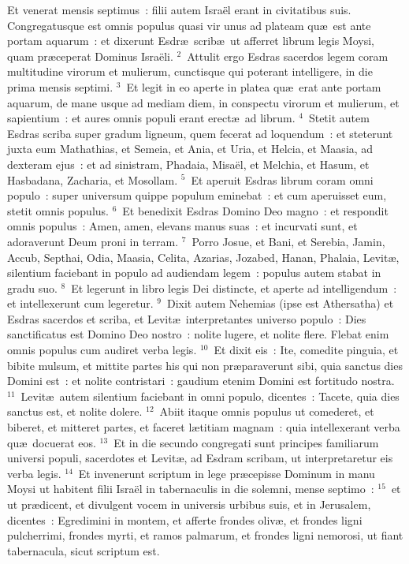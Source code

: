 \lettrine[lines=10,image=true,loversize=0.05,lraise=-0.03]{E}{}t venerat mensis septimus~: filii autem Isra\"el erant in civitatibus suis. Congregatusque est omnis populus quasi vir unus ad plateam qu\ae\ est ante portam aquarum~: et dixerunt Esdr\ae\ scrib\ae\ ut afferret librum legis Moysi, quam pr\ae ceperat Dominus Isra\"eli.
${}^{2}$~Attulit ergo Esdras sacerdos legem coram multitudine virorum et mulierum, cunctisque qui poterant intelligere, in die prima mensis septimi.
${}^{3}$~Et legit in eo aperte in platea qu\ae\ erat ante portam aquarum, de mane usque ad mediam diem, in conspectu virorum et mulierum, et sapientium~: et aures omnis populi erant erect\ae\ ad librum.
${}^{4}$~Stetit autem Esdras scriba super gradum ligneum, quem fecerat ad loquendum~: et steterunt juxta eum Mathathias, et Semeia, et Ania, et Uria, et Helcia, et Maasia, ad dexteram ejus~: et ad sinistram, Phadaia, Misa\"el, et Melchia, et Hasum, et Hasbadana, Zacharia, et Mosollam.
${}^{5}$~Et aperuit Esdras librum coram omni populo~: super universum quippe populum eminebat~: et cum aperuisset eum, stetit omnis populus.
${}^{6}$~Et benedixit Esdras Domino Deo magno~: et respondit omnis populus~: Amen, amen, elevans manus suas~: et incurvati sunt, et adoraverunt Deum proni in terram.
${}^{7}$~Porro Josue, et Bani, et Serebia, Jamin, Accub, Septhai, Odia, Maasia, Celita, Azarias, Jozabed, Hanan, Phalaia, Levit\ae , silentium faciebant in populo ad audiendam legem~: populus autem stabat in gradu suo.
${}^{8}$~Et legerunt in libro legis Dei distincte, et aperte ad intelligendum~: et intellexerunt cum legeretur.
${}^{9}$~Dixit autem Nehemias (ipse est Athersatha) et Esdras sacerdos et scriba, et Levit\ae\ interpretantes universo populo~: Dies sanctificatus est Domino Deo nostro~: nolite lugere, et nolite flere. Flebat enim omnis populus cum audiret verba legis.
${}^{10}$~Et dixit eis~: Ite, comedite pinguia, et bibite mulsum, et mittite partes his qui non pr\ae paraverunt sibi, quia sanctus dies Domini est~: et nolite contristari~: gaudium etenim Domini est fortitudo nostra.
${}^{11}$~Levit\ae\ autem silentium faciebant in omni populo, dicentes~: Tacete, quia dies sanctus est, et nolite dolere.
${}^{12}$~Abiit itaque omnis populus ut comederet, et biberet, et mitteret partes, et faceret l\ae titiam magnam~: quia intellexerant verba qu\ae\ docuerat eos.
${}^{13}$~Et in die secundo congregati sunt principes familiarum universi populi, sacerdotes et Levit\ae , ad Esdram scribam, ut interpretaretur eis verba legis.
${}^{14}$~Et invenerunt scriptum in lege pr\ae cepisse Dominum in manu Moysi ut habitent filii Isra\"el in tabernaculis in die solemni, mense septimo~:
${}^{15}$~et ut pr\ae dicent, et divulgent vocem in universis urbibus suis, et in Jerusalem, dicentes~: Egredimini in montem, et afferte frondes oliv\ae , et frondes ligni pulcherrimi, frondes myrti, et ramos palmarum, et frondes ligni nemorosi, ut fiant tabernacula, sicut scriptum est.


